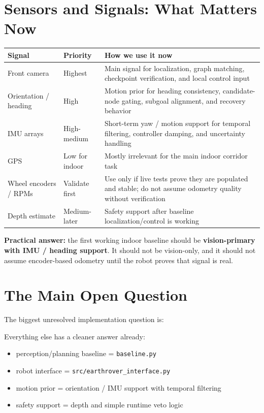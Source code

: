 \documentclass[11pt,a4paper]{article}
\begin{document}
\section{Sensors and Signals: What Matters Now}

\begin{tabularx}{\textwidth}{p{} p{} X}
\toprule
\textbf{Signal} & \textbf{Priority} & \textbf{How we use it now} \\
\midrule
Front camera & Highest & Main signal for localization, graph matching, checkpoint verification, and local control input \\
Orientation / heading & High & Motion prior for heading consistency, candidate-node gating, subgoal alignment, and recovery behavior \\
IMU arrays & High-medium & Short-term yaw / motion support for temporal filtering, controller damping, and uncertainty handling \\
GPS & Low for indoor & Mostly irrelevant for the main indoor corridor task \\
Wheel encoders / RPMs & Validate first & Use only if live tests prove they are populated and stable; do not assume odometry quality without verification \\
Depth estimate & Medium-later & Safety support after baseline localization/control is working \\
\bottomrule
\end{tabularx}

\textbf{Practical answer:} the first working indoor baseline should be
\textbf{vision-primary with IMU / heading support}. It should not be vision-only,
and it should not assume encoder-based odometry until the robot proves that signal is real.


\section{The Main Open Question}

The biggest unresolved implementation question is:

\begin{center}
\end{center}

Everything else has a cleaner answer already:

\begin{itemize}[nosep]
  \item perception/planning baseline = \texttt{baseline.py}
  \item robot interface = \texttt{src/earthrover\_interface.py}
  \item motion prior = orientation / IMU support with temporal filtering
  \item safety support = depth and simple runtime veto logic
\end{itemize}
\end{document}
